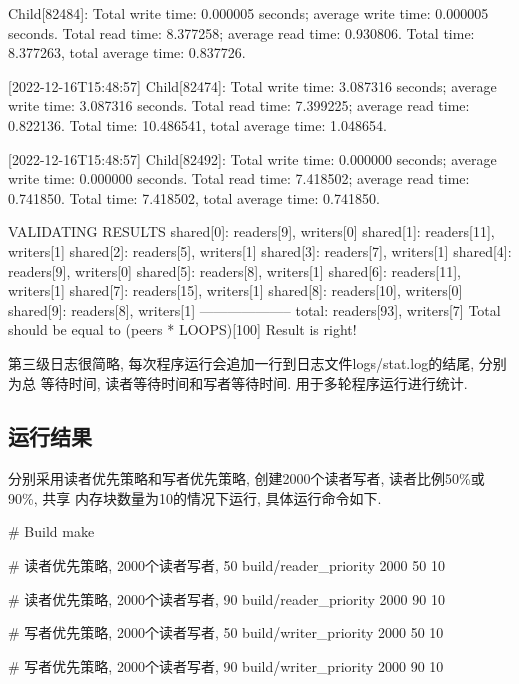 \begin{code}
    [2022-12-16T15:48:55] Child[82484]:
    Total write time: 0.000005 seconds; average write time: 0.000005 seconds.
    Total read time: 8.377258; average read time: 0.930806.
    Total time: 8.377263, total average time: 0.837726.

        [2022-12-16T15:48:57] Child[82474]:
    Total write time: 3.087316 seconds; average write time: 3.087316 seconds.
    Total read time: 7.399225; average read time: 0.822136.
    Total time: 10.486541, total average time: 1.048654.

        [2022-12-16T15:48:57] Child[82492]:
    Total write time: 0.000000 seconds; average write time: 0.000000 seconds.
    Total read time: 7.418502; average read time: 0.741850.
    Total time: 7.418502, total average time: 0.741850.


    VALIDATING RESULTS
    shared[0]: readers[9], writers[0]
    shared[1]: readers[11], writers[1]
    shared[2]: readers[5], writers[1]
    shared[3]: readers[7], writers[1]
    shared[4]: readers[9], writers[0]
    shared[5]: readers[8], writers[1]
    shared[6]: readers[11], writers[1]
    shared[7]: readers[15], writers[1]
    shared[8]: readers[10], writers[0]
    shared[9]: readers[8], writers[1]
    --------------------
    total: readers[93], writers[7]
    Total should be equal to (peers * LOOPS)[100]
    Result is right!

\end{code}

第三级日志很简略, 每次程序运行会追加一行到日志文件logs/stat.log的结尾, 分别为总
等待时间, 读者等待时间和写者等待时间. 用于多轮程序运行进行统计.


\subsection{运行结果}
分别采用读者优先策略和写者优先策略, 创建2000个读者写者, 读者比例50\%或90\%, 共享
内存块数量为10的情况下运行, 具体运行命令如下.
\begin{code}
    # Build
    make

    # 读者优先策略, 2000个读者写者, 50%
    build/reader_priority 2000 50 10

    # 读者优先策略, 2000个读者写者, 90%
    build/reader_priority 2000 90 10

    # 写者优先策略, 2000个读者写者, 50%
    build/writer_priority 2000 50 10

    # 写者优先策略, 2000个读者写者, 90%
    build/writer_priority 2000 90 10
\end{code}

